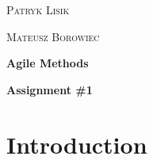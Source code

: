 \documentclass[a4paper,12pt]{article}
\begin{document}
\begin{titlepage}
\vspace{3cm}

\begin{minipage}{0.33 \textwidth}
\begin{flushleft}
\large
\textsc{Patryk Lisik}
\end{flushleft}
\end{minipage}
\hspace{0.2\textwidth}
\begin{minipage}{0.33 \textwidth}
\begin{flushleft}
\large
\textsc{Mateusz Borowiec}
\end{flushleft}
\end{minipage}

\vspace{2cm}

{\center\huge\bfseries Agile Methods \par}

\vspace{1.5cm}
{\center\huge\bfseries Assignment \#1\par}

\end{titlepage}
\section{Introduction}
\end{document}
